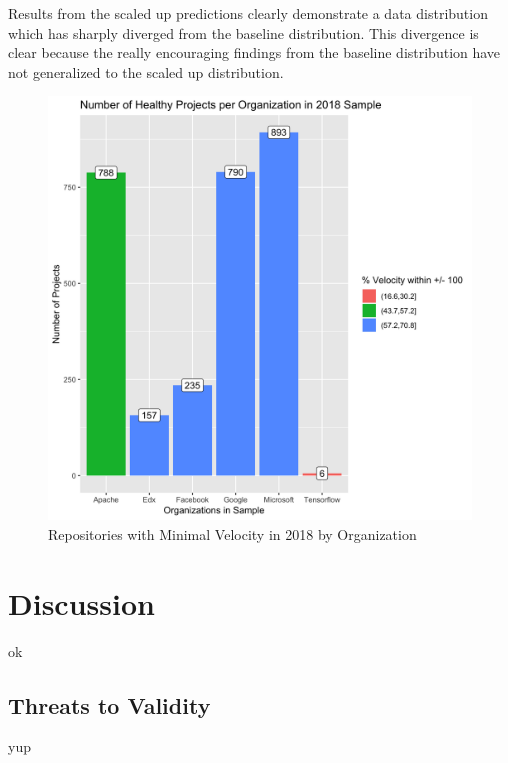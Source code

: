\documentclass{article}
\begin{document}
Results from the scaled up predictions clearly demonstrate a data
distribution which has sharply diverged from the baseline distribution.
This divergence is clear because the really encouraging findings from
the baseline distribution have not generalized to the scaled up distribution.


\begin{figure}[h]
  \centering
  \includegraphics[scale=0.1]{f2}
  \caption{Repositories with Minimal Velocity in 2018 by Organization}
  \label{fig:desc_scale}
  \end{figure}


\section{Discussion}

ok

\subsection{Threats to Validity}

 yup



\end{document}
